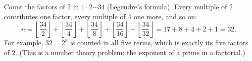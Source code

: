 Count the factors of $2$ in $1\cdot2\cdots34$ (Legendre's formula). Every multiple of $2$ contributes one factor, every multiple of $4$ one more, and so on:
\[
n=\left\lfloor\dfrac{34}{2}\right\rfloor+\left\lfloor\dfrac{34}{4}\right\rfloor+\left\lfloor\dfrac{34}{8}\right\rfloor+\left\lfloor\dfrac{34}{16}\right\rfloor+\left\lfloor\dfrac{34}{32}\right\rfloor=17+8+4+2+1=\boxed{32}.
\]
For example, $32=2^5$ is counted in all five terms, which is exactly its five factors of $2$. (This is a number theory problem: the exponent of a prime in a factorial.)
